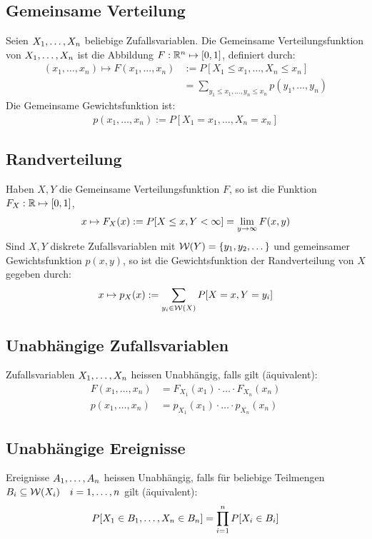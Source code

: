 \subsection*{Gemeinsame Verteilung}
Seien $X_1, \dots, X_n$ beliebige Zufallsvariablen. Die Gemeinsame
Verteilungsfunktion von $X_1, \dots, X_n$ ist die Abbildung $F: \mathbb{R}^n \mapsto
  [0, 1]$, definiert durch:
\begin{align*}
  (x_1, \dots, x_n) \mapsto F (x_1, \dots, x_n) & := P[X_1 \leq x_1, \dots, X_n \leq x_n]                        \\
                                                & = \sum_{y_1 \leq x_1, \dots, y_n \leq x_n} p (y_1, \dots, y_n)
\end{align*}
Die Gemeinsame Gewichtsfunktion ist:
\begin{align*}
  p (x_1, \dots, x_n) := P[X_1 = x_1, \dots, X_n = x_n]
\end{align*}
\subsection*{Randverteilung}
Haben $X, Y$ die Gemeinsame Verteilungsfunktion $F$, so ist die Funktion $F_X:
  \mathbb{R} \mapsto [0, 1]$,
\begin{align*}
  x \mapsto F_X (x) := P[X \leq x, Y < \infty] = \lim_{y \rightarrow \infty} F (x, y)
\end{align*}
Sind $X, Y$ diskrete Zufallsvariablen mit $\mathcal{W} (Y) = \{y_1, y_2, \dots\}$
und gemeinsamer Gewichtsfunktion $p (x, y)$, so ist die Gewichtsfunktion
der Randverteilung von $X$ gegeben durch:
\begin{align*}
  x \mapsto p_X (x) := \sum_{y_i \in \mathcal{W} (X)} P[X = x, Y = y_i]
\end{align*}
\subsection*{Unabhängige Zufallsvariablen}
Zufallsvariablen $X_1, \dots, X_n$ heissen Unabhängig, falls gilt
(äquivalent):
\begin{align*}
  F (x_1, \dots, x_n) & = F_{X_1} (x_1) \cdot \hdots \cdot F_{X_n} (x_n) \\
  p (x_1, \dots, x_n) & = p_{X_1} (x_1) \cdot \hdots \cdot p_{X_n} (x_n)
\end{align*}
\subsection*{Unabhängige Ereignisse}
Ereignisse $A_1, \dots, A_n$ heissen Unabhängig, falls für beliebige Teilmengen
$B_i \subseteq \mathcal{W} (X_i) \quad i = 1, \dots, n$ gilt (äquivalent):
\begin{align*}
  P[X_1 \in B_1, \dots, X_n \in B_n] = \prod_{i = 1}^n P[X_i \in B_i]
\end{align*}
